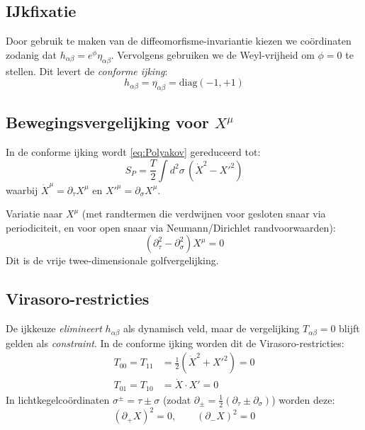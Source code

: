 \documentclass[12pt,a4paper]{article}
\begin{document}
\subsection{IJkfixatie}

Door gebruik te maken van de diffeomorfisme-invariantie kiezen we co\"ordinaten zodanig dat $h_{\alpha\beta} = e^\phi \eta_{\alpha\beta}$. Vervolgens gebruiken we de Weyl-vrijheid om $\phi = 0$ te stellen. Dit levert de \emph{conforme ijking}:
\begin{equation}
  h_{\alpha\beta} = \eta_{\alpha\beta} = \mathrm{diag}(-1,+1)
\end{equation}

\subsection{Bewegingsvergelijking voor $X^\mu$}

In de conforme ijking wordt \eqref{eq:Polyakov} gereduceerd tot:
\begin{equation}
  S_P = \frac{T}{2}\int d^2\sigma\,\left(\dot X^2 - X'^2\right)
\end{equation}
waarbij $\dot X^\mu = \partial_\tau X^\mu$ en $X'^\mu = \partial_\sigma X^\mu$.

Variatie naar $X^\mu$ (met randtermen die verdwijnen voor gesloten snaar via periodiciteit, en voor open snaar via Neumann/Dirichlet randvoorwaarden):
\begin{equation}
  \boxed{\left(\partial_\tau^2 - \partial_\sigma^2\right)X^\mu = 0}
  \label{eq:golfvgl}
\end{equation}
Dit is de vrije twee-dimensionale golfvergelijking.

\subsection{Virasoro-restricties}

De ijkkeuze \emph{elimineert} $h_{\alpha\beta}$ als dynamisch veld, maar de vergelijking $T_{\alpha\beta} = 0$ blijft gelden als \emph{constraint}. In de conforme ijking worden dit de Virasoro-restricties:
\begin{align}
  T_{00} = T_{11} &= \tfrac{1}{2}(\dot X^2 + X'^2) = 0 \label{eq:V1}\\
  T_{01} = T_{10} &= \dot X\cdot X' = 0 \label{eq:V2}
\end{align}
In lichtkegelco\"ordinaten $\sigma^\pm = \tau \pm \sigma$ (zodat $\partial_\pm = \tfrac{1}{2}(\partial_\tau \pm \partial_\sigma)$) worden deze:
\begin{equation}
  (\partial_+ X)^2 = 0, \qquad (\partial_- X)^2 = 0
  \label{eq:Virasoro_licht}
\end{equation}
\end{document}
